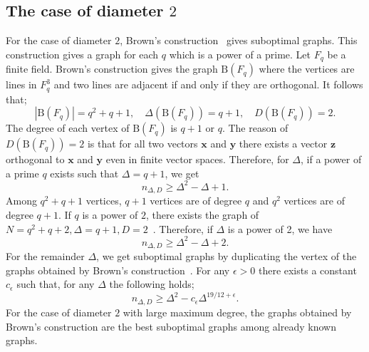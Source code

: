 \documentclass[conference]{IEEEtran}
\newcommand{\B}{\mathrm{B}}
\begin{document}
\subsection{The case of diameter $2$}
For the case of diameter $2$, Brown's construction~\cite{brown1966graphs,MilSir2005} gives suboptimal graphs.
This construction gives a graph for each $q$ which is a power of a prime.
Let $F_q$ be a finite field.
Brown's construction gives the graph $\B(F_q)$ where the vertices are lines in $F_q^3$ and two lines are adjacent if and only if they are orthogonal.
It follows that;
\[ |\B(F_q)| = q^2+q+1, \quad \Delta(\B(F_q)) = q+1, \quad D(\B(F_q))=2.\]
The degree of each vertex of $\B(F_q)$ is $q+1$ or $q$.
The reason of $D(\B(F_q))=2$ is that
for all two vectors ${\bm x}$ and ${\bm y}$ there exists a vector ${\bm z}$ orthogonal to ${\bm x}$ and ${\bm y}$ even in finite vector spaces.
Therefore, for ${\Delta}$, if a power of a prime $q$ exists such that $\Delta=q+1$, we get
\[ n_{\Delta, D} \geq \Delta^2 - \Delta + 1. \]
Among $q^2+q+1$ vertices, $q+1$ vertices are of degree $q$ and $q^2$ vertices are of degree $q+1$.
If $q$ is a power of $2$, there exists the graph of $N=q^2+q+2, \Delta=q+1,D=2$~\cite{journals/networks/ErdosFH80}.
Therefore, if $\Delta$ is a power of 2, we have
\[ n_{\Delta, D} \geq \Delta^2 - \Delta + 2. \]
For the remainder $\Delta$, we get suboptimal graphs by duplicating the vertex of the graphs obtained by Brown's construction~\cite{MilSir2005}.
For any $\epsilon >0$ there exists a constant $c_\epsilon$ such that, for any $\Delta$ the following holds;
\[ n_{\Delta, D} \geq \Delta^2 - c_\epsilon \Delta^{19/12+\epsilon}. \]
For the case of diameter $2$ with large maximum degree, the graphs obtained by Brown's construction
are the best suboptimal graphs among already known graphs.
\end{document}
